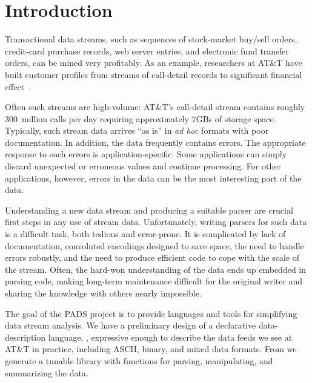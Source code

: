 \chapter{Introduction}
\label{chap:introduction}
Transactional data streams, such as sequences of stock-market buy/sell orders,
credit-card purchase records, web server entries, and electronic fund
transfer orders, can be mined very profitably.  As an example,
researchers at AT\&T have built customer profiles from streams of
call-detail records to significant financial effect~\cite{kdd98,kdd99,kdd00}.   

Often such streams are high-volume: AT\&T's call-detail stream contains
roughly 300~million calls per day requiring approximately 7GBs of
storage space.  Typically, such stream data arrives ``as is'' in
\textit{ad hoc} formats with poor documentation.  In addition, the
data frequently contains errors.  The appropriate response to such
errors is application-specific. Some applications can simply discard
unexpected or erroneous values and continue processing.  For other
applications, however, errors in the data can be the most interesting
part of the data.  

Understanding a new data stream and producing a suitable parser are
crucial first steps in any use of stream data.  Unfortunately, writing
parsers for such data is a difficult task, both tedious and
error-prone. It is complicated by lack of documentation, convoluted
encodings designed to save space, the need to handle errors
robustly, and the need to produce efficient code to cope with the
scale of the stream.  Often, the hard-won understanding of the data
ends up embedded in parsing code, making long-term maintenance
difficult for the original writer and sharing the knowledge with
others nearly impossible.

The goal of the PADS project is to provide languages and tools for
simplifying data stream analysis.  We have a preliminary design of a
declarative data-description language, \padsl{}, expressive enough to
describe the data feeds we see at AT\&T in practice, including ASCII,
binary, and mixed data formats.  From \padsl{} we generate a tunable \C{}
library with functions for parsing, manipulating, and summarizing the data.  

